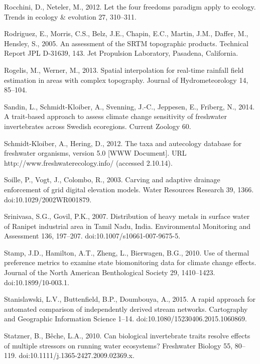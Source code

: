 \begin{thebibliography}
\bibitem{} \hangindent=1cm Rocchini, D., Neteler, M., 2012. Let the four freedoms paradigm apply to ecology. Trends in ecology & evolution 27, 310–311.

\bibitem{} \hangindent=1cm Rodriguez, E., Morris, C.S., Belz, J.E., Chapin, E.C., Martin, J.M., Daffer, M., Hensley, S., 2005. An assessment of the SRTM topographic products. Technical Report JPL D-31639, 143. Jet Propulsion Laboratory, Pasadena, California.

\bibitem{} \hangindent=1cm Rogelis, M., Werner, M., 2013. Spatial interpolation for real-time rainfall field estimation in areas with complex topography. Journal of Hydrometeorology 14, 85–104.

\bibitem{} \hangindent=1cm Sandin, L., Schmidt-Kloiber, A., Svenning, J.-C., Jeppesen, E., Friberg, N., 2014. A trait-based approach to assess climate change sensitivity of freshwater invertebrates across Swedish ecoregions. Current Zoology 60.

\bibitem{} \hangindent=1cm Schmidt-Kloiber, A., Hering, D., 2012. The taxa and autecology database for freshwater organisms, version 5.0 [WWW Document]. URL http://www.freshwaterecology.info/ (accessed 2.10.14).

\bibitem{} \hangindent=1cm Soille, P., Vogt, J., Colombo, R., 2003. Carving and adaptive drainage enforcement of grid digital elevation models. Water Resources Research 39, 1366. doi:10.1029/2002WR001879.

\bibitem{} \hangindent=1cm Srinivasa, S.G., Govil, P.K., 2007. Distribution of heavy metals in surface water of Ranipet industrial area in Tamil Nadu, India. Environmental Monitoring and Assessment 136, 197–207. doi:10.1007/s10661-007-9675-5.

\bibitem{} \hangindent=1cm Stamp, J.D., Hamilton, A.T., Zheng, L., Bierwagen, B.G., 2010. Use of thermal preference metrics to examine state biomonitoring data for climate change effects. Journal of the North American Benthological Society 29, 1410–1423. doi:10.1899/10-003.1.

\bibitem{} \hangindent=1cm Stanislawski, L.V., Buttenfield, B.P., Doumbouya, A., 2015. A rapid approach for automated comparison of independently derived stream networks. Cartography and Geographic Information Science 1–14. doi:10.1080/15230406.2015.1060869.

\bibitem{} \hangindent=1cm Statzner, B., Bêche, L.A., 2010. Can biological invertebrate traits resolve effects of multiple stressors on running water ecosystems? Freshwater Biology 55, 80–119. doi:10.1111/j.1365-2427.2009.02369.x.


\end{thebibliography}
